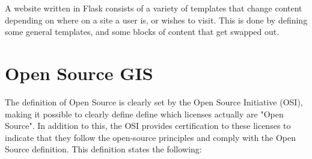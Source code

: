 A website written in Flask consists of a variety of templates that change content depending on where on a site a user is, or wishes to visit. This is done by defining some general templates, and some blocks of content that get swapped out. 


\section{Open Source GIS}

The definition of Open Source is clearly set by the Open Source Initiative (OSI), making it possible to clearly define define which licenses actually are "Open Source". In addition to this, the OSI provides certification to these licenses to indicate that they follow the open-source principles and comply with the Open Source definition. This definition states the following:
